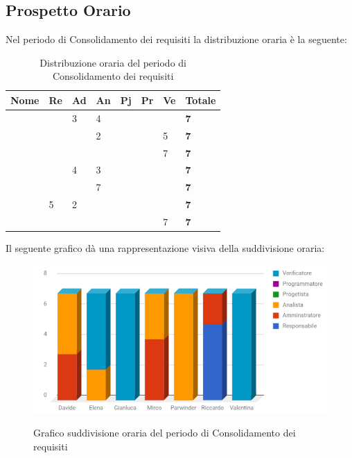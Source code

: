 \documentclass[PianoDiProgetto.tex]{subfiles}
\begin{document}
\subsection{Prospetto Orario}
Nel periodo di Consolidamento dei requisiti la distribuzione oraria è la seguente:
\begin{center}

\begin{table}[htbp]
	\centering
	\renewcommand\arraystretch{1.5}
	\begin{tabularx}{\textwidth}{p{4cm}|p{1cm}|p{1cm}|p{1cm}|p{1cm}|p{1cm}|p{1cm}|p{2cm}}
		\hline
		\textbf{Nome} & \textbf{Re} & \textbf{Ad} & \textbf{An} & \textbf{Pj} & \textbf{Pr} & \textbf{Ve} & \textbf{Totale} \\
		\hline
		\Davide & \ & 3 & 4 & \ & \ & \ & \textbf{7} \\
		\hline
		\Elena & \ & \ & 2 & \ & \ & 5 & \textbf{7} \\
		\hline
		\Gianluca & \ & \ & \ & \ & \ & 7 & \textbf{7} \\
		\hline
		\Mirco & \ & 4 & 3 & \ & \ & \ & \textbf{7} \\
		\hline
		\Parwinder & \ & \ & 7 & \ & \ & \ & \textbf{7} \\
		\hline
		\Riccardo & 5 & 2 & \ & \ & \ & \ & \textbf{7} \\
		\hline
		\Valentina & \ & \ & \ & \ & \ & 7 & \textbf{7} \\
		\hline
	\end{tabularx}
	\caption{Distribuzione oraria del periodo di Consolidamento dei requisiti}
	\label{my-label}
\end{table}
\end{center}
Il seguente grafico dà una rappresentazione visiva della suddivisione oraria:

\begin{figure}[h]
	\centering
	\includegraphics[width=12.5cm]{images/prospettoOrario/consolidamento.png}
	\label{fig:foo}
	\caption{Grafico suddivisione oraria del periodo di Consolidamento dei requisiti}
\end{figure} 
\end{document}
